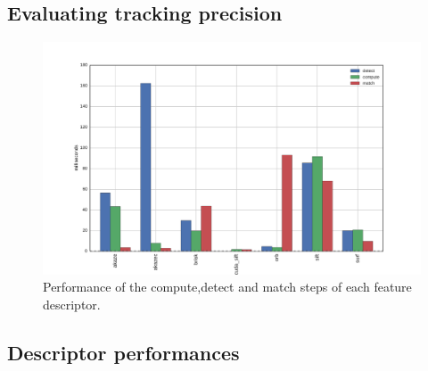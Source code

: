 \subsection{Evaluating tracking precision}

\begin{figure}
	\includegraphics[width=0.95\linewidth]{imgs/performances.pdf}
\vspace{-2.5mm}	
\caption{Performance of the compute,detect and match steps of each feature descriptor.}
\label{fig:ros}
\end{figure}

\subsection{Descriptor performances}


